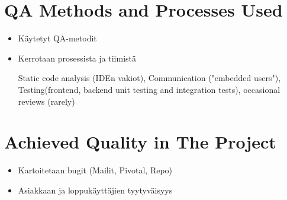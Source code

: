 
 \section{QA Methods and Processes Used}
 
 \begin{itemize}
 
 \item Käytetyt QA-metodit
 \item Kerrotaan prosessista ja tiimistä
 
Static code analysis (IDEn vakiot), Communication ("embedded users"), Testing(frontend, backend unit testing and integration tests), occasional reviews (rarely)

 \end{itemize}
 
 \section{Achieved Quality in The Project}

 \begin{itemize}
 
 \item Kartoitetaan bugit (Mailit, Pivotal, Repo)  
 \item Asiakkaan ja loppukäyttäjien tyytyväisyys
 
 \end{itemize}
 